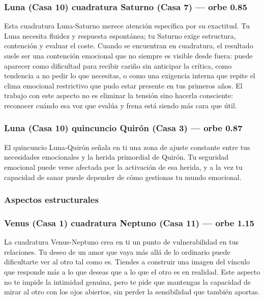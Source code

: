 \documentclass[11pt,a4paper]{article}
\begin{document}
\subsubsection*{Luna (Casa 10) cuadratura Saturno (Casa 7) --- orbe 0.85\textdegree}
Esta cuadratura Luna-Saturno merece atención específica por su exactitud. Tu Luna necesita fluidez y respuesta espontánea; tu Saturno exige estructura, contención y evaluar el coste. Cuando se encuentran en cuadratura, el resultado suele ser una contención emocional que no siempre es visible desde fuera: puede aparecer como dificultad para recibir cariño sin anticipar la crítica, como tendencia a no pedir lo que necesitas, o como una exigencia interna que repite el clima emocional restrictivo que pudo estar presente en tus primeros años. El trabajo con este aspecto no es eliminar la tensión sino hacerla consciente: reconocer cuándo esa voz que evalúa y frena está siendo más cara que útil.

\subsubsection*{Luna (Casa 10) quincuncio Quirón (Casa 3) --- orbe 0.87\textdegree}
El quincuncio Luna-Quirón señala en ti una zona de ajuste constante entre tus necesidades emocionales y la herida primordial de Quirón. Tu seguridad emocional puede verse afectada por la activación de esa herida, y a la vez tu capacidad de sanar puede depender de cómo gestionas tu mundo emocional.

\subsubsection*{Aspectos estructurales}
\subsubsection*{Venus (Casa 1) cuadratura Neptuno (Casa 11) --- orbe 1.15\textdegree}
La cuadratura Venus-Neptuno crea en ti un punto de vulnerabilidad en tus relaciones. Tu deseo de un amor que vaya más allá de lo ordinario puede dificultarte ver al otro tal como es. Tiendes a construir una imagen del vínculo que responde más a lo que deseas que a lo que el otro es en realidad. Este aspecto no te impide la intimidad genuina, pero te pide que mantengas la capacidad de mirar al otro con los ojos abiertos, sin perder la sensibilidad que también aportas.
\end{document}
